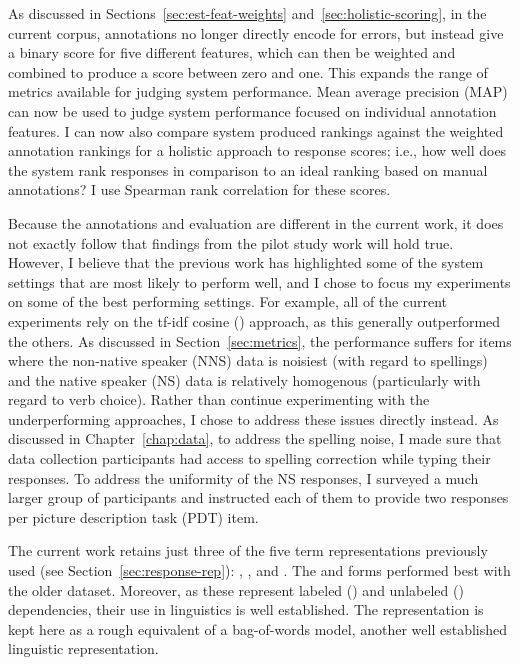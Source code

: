 As discussed in Sections~\ref{sec:est-feat-weights} and~\ref{sec:holistic-scoring}, in the current corpus, annotations no longer directly encode for errors, but instead give a binary score for five different features, which can then be weighted and combined to produce a score between zero and one. This expands the range of metrics available for judging system performance. Mean average precision (MAP) can now be used to judge system performance focused on individual annotation features. I can now also compare system produced rankings against the weighted annotation rankings for a holistic approach to response scores; i.e., how well does the system rank responses in comparison to an ideal ranking based on manual annotations? I use Spearman rank correlation for these scores.

Because the annotations and evaluation are different in the current work, it does not exactly follow that findings from the pilot study work will hold true. However, I believe that the previous work has highlighted some of the system settings that are most likely to perform well, and I chose to focus my experiments on some of the best performing settings. For example, all of the current experiments rely on the tf-idf cosine () approach, as this generally outperformed the others. As discussed in Section~\ref{sec:metrics}, the  performance suffers for items where the non-native speaker (NNS) data is noisiest (with regard to spellings) and the native speaker (NS) data is relatively homogenous (particularly with regard to verb choice). Rather than continue experimenting with the underperforming approaches, I chose to address these issues directly instead. As discussed in Chapter~\ref{chap:data}, to address the spelling noise, I made sure that data collection participants had access to spelling correction while typing their responses. To address the uniformity of the NS responses, I surveyed a much larger group of participants and instructed each of them to provide two responses per picture description task (PDT) item.

The current work retains just three of the five term representations previously used (see Section~\ref{sec:response-rep}): , , and . The  and  forms performed best with the older dataset. Moreover, as these represent labeled () and unlabeled () dependencies, their use in linguistics is well established. The  representation is kept here as a rough equivalent of a bag-of-words model, another well established linguistic representation.

